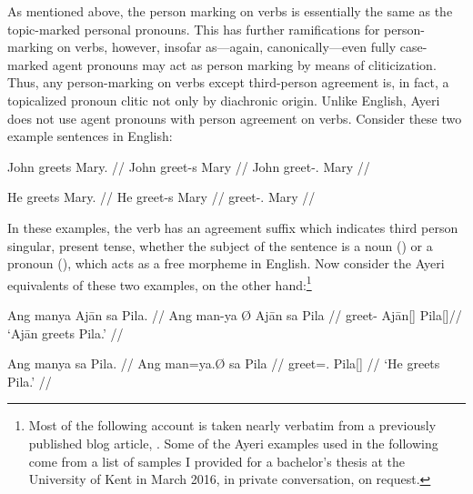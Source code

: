 As mentioned above, the person marking on verbs is essentially the same as the 
topic-marked personal pronouns. This has further ramifications for 
person-marking on verbs, however, insofar as---again, canonically---even fully 
case-marked agent pronouns may act as person marking by means of cliticization. 
Thus, any person-marking on verbs except third-person agreement is, in fact, a 
topicalized pronoun clitic not only by diachronic origin. Unlike English, Ayeri 
does not use agent pronouns with person agreement on verbs. Consider these two 
example sentences in English:

\pex
\a\label{ex:vbagrengnn}\begingl{}%
	\gla John greets Mary. //
	\glb John greet-s Mary //
	\glc John greet-\Tsg{}.\Prs{} Mary //
\endgl

\a\label{ex:vbagrengpr}\begingl
	\gla He greets Mary. //
	\glb He greet-s Mary //
	\glc \TsgM{} greet-\Tsg{}.\Prs{} Mary //
\endgl

\xe

In these examples, the verb has an agreement suffix  which indicates 
third person singular, present tense, whether the subject of the sentence is a 
noun () or a pronoun (), which acts as a free morpheme in 
English. Now consider the Ayeri equivalents of these two examples, on the other 
hand:\footnote{Most of the following account is taken nearly verbatim from a 
previously published blog article, \citet{benung:verbagreement}. Some of the 
Ayeri examples used in the following come from a list of samples I provided for 
a bachelor's thesis at the University of Kent in March 2016, in private 
conversation, on request.%
}

\pex %
\a\label{ex:vbagr}\begingl
	\gla Ang manya {} Ajān sa Pila. //
	\glb Ang man-ya Ø Ajān sa Pila //
	\glc \AgtT{} greet-\TsgM{} \Top{} ​Ajān[\TsgM{}] \Parg{} Pila[\TsgF{}]//
	\glft `Ajān greets Pila.' //
\endgl

\a\label{ex:vbclt}\begingl
	\gla Ang manya sa Pila. //
	\glb Ang man=ya.Ø sa ​Pila //
	\glc \AgtT{} greet=\TsgM{}.\Top{} \Parg{} ​Pila[\TsgF{}] //
	\glft `He greets Pila.' //
\endgl

